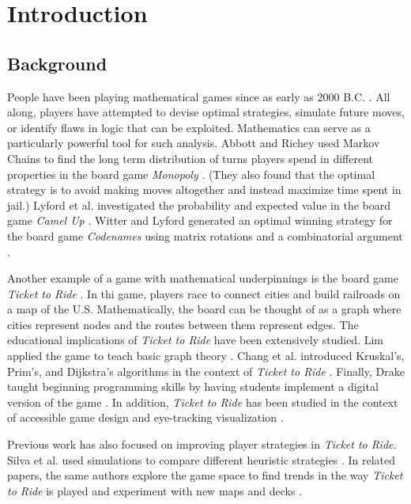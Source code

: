\section{Introduction}
\subsection{Background}
People have been playing mathematical games
since as early as 2000 B.C.
\cite{cornelius1986historical}.
All along,
players have attempted to devise optimal
strategies, simulate future moves, or identify
flaws in logic that can be exploited.
Mathematics can serve as a particularly powerful tool for
such analysis.
Abbott and Richey used Markov Chains
to find the long term 
distribution of turns players spend in different
properties in the board game
\textit{Monopoly} \cite{abbott1997take, magie1935}.
(They also found that the optimal strategy is to avoid making
moves altogether and instead maximize time spent in jail.)
Lyford et al. investigated the probability and expected value 
in the board game \textit{Camel Up}
\cite{bogen2014, lyford2019using}.
Witter and Lyford generated an optimal winning strategy for the 
board game \textit{Codenames} using matrix rotations
and a combinatorial argument \cite{chvatil2015}.

Another example of a game with mathematical underpinnings is
the board game \textit{Ticket to Ride} \cite{moon2004ticket}. 
In thi game, players race to connect 
cities and build railroads on a map of the U.S.
Mathematically, the board
can be thought of as a graph where
cities represent nodes and the
routes between them represent edges.
The educational implications of \textit{Ticket to Ride}
have been extensively studied.
Lim applied the game to teach basic graph theory
\cite{lim2007taking}.
Chang et al. introduced Kruskal's, Prim's, and Dijkstra's
algorithms in the context of \textit{Ticket to Ride}
\cite{chang2008learning}.
Finally, Drake taught beginning programming skills by having
students implement a digital version 
of the game \cite{drake2011teaching}.
In addition, \textit{Ticket to Ride} 
has been studied in the context of
accessible game design and eye-tracking visualization
\cite{eriksson2005enhancing, newn2017evaluating}.

Previous work has also focused on improving player 
strategies in \textit{Ticket to Ride}.
Silva et al. used simulations to compare different
heuristic strategies \cite{de2017playtesting}.
In related papers, the same authors explore the 
game space to find trends in the way \textit{Ticket to Ride}
is played and experiment with new maps and decks 
\cite{de2017evaluator, de2018evolving}.

